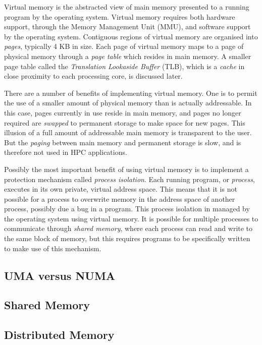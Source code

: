 \documentclass{report}
\begin{document}
Virtual memory is the abstracted view of main memory presented to a running program by the operating system. Virtual memory requires both hardware support, through the Memory Management Unit (MMU), and software support by the operating system. Contiguous regions of virtual memory are organised into \emph{pages}, typically 4 KB in size. Each page of virtual memory maps to a page of physical memory through a \emph{page table} which resides in main memory. A smaller page table called the \emph{Translation Lookaside Buffer} (TLB), which is a \emph{cache} in close proximity to each processing core, is discussed later.

There are a number of benefits of implementing virtual memory. One is to permit the use of a smaller amount of physical memory than is actually addressable. In this case, pages currently in use reside in main memory, and pages no longer required are \emph{swapped} to permanent storage to make space for new pages. This illusion of a full amount of addressable main memory is transparent to the user. But the \emph{paging} between main memory and permanent storage is slow, and is therefore not used in HPC applications.

Possibly the most important benefit of using virtual memory is to implement a protection mechanism called \emph{process isolation}. Each running program, or \emph{process}, executes in its own private, virtual address space. This means that it is not possible for a process to overwrite memory in the address space of another process, possibly due a bug in a program. This process isolation in managed by the operating system using virtual memory. It is possible for multiple processes to communicate through \emph{shared memory}, where each process can read and write to the same block of memory, but this requires programs to be specifically written to make use of this mechanism. 

  
\subsection{UMA versus NUMA}

\subsection{Shared Memory}

\subsection{Distributed Memory}
\end{document}
